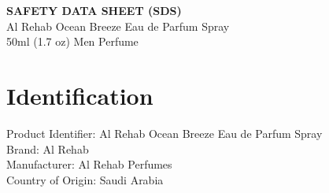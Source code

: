 \documentclass[11pt]{article}
\begin{document}
\begin{center}\textbf{SAFETY DATA SHEET (SDS)}\\Al Rehab Ocean Breeze Eau de Parfum Spray\\50ml (1.7 oz) Men Perfume\end{center}
\section*{Identification}
Product Identifier: Al Rehab Ocean Breeze Eau de Parfum Spray\\Brand: Al Rehab\\Manufacturer: Al Rehab Perfumes\\Country of Origin: Saudi Arabia
\end{document}
